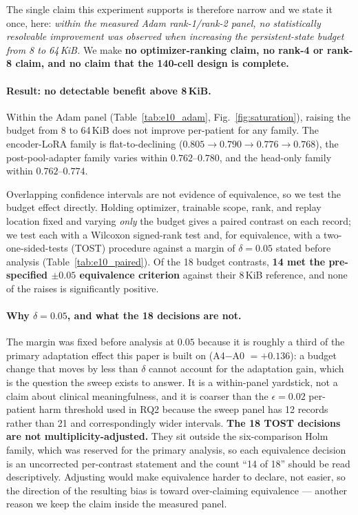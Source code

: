 The single claim this experiment supports is therefore narrow and we state it
once, here: \emph{within the measured Adam rank-1/rank-2 panel, no statistically
resolvable improvement was observed when increasing the persistent-state budget
from 8 to 64\,KiB.} We make \textbf{no optimizer-ranking claim, no rank-4 or
rank-8 claim, and no claim that the 140-cell design is complete.}

\paragraph{Result: no detectable benefit above 8\,KiB.} Within the Adam panel
(Table~\ref{tab:e10_adam}, Fig.~\ref{fig:saturation}), raising the budget from 8
to 64\,KiB does not improve per-patient \macrof{} for any family. The encoder-LoRA
family is flat-to-declining ($0.805 \to 0.790 \to 0.776 \to 0.768$), the
post-pool-adapter family varies within $0.762$--$0.780$, and the head-only family
within $0.762$--$0.774$.

Overlapping confidence intervals are not evidence of equivalence, so we test the
budget effect directly. Holding optimizer, trainable scope, rank, and replay
location fixed and varying \emph{only} the budget gives a paired contrast on each
record; we test each with a Wilcoxon signed-rank test and, for equivalence, with
a two-one-sided-tests (TOST) procedure against a margin of $\delta = 0.05$
\macrof{} stated before analysis (Table~\ref{tab:e10_paired}). Of the 18
budget contrasts, \textbf{14 met the pre-specified $\pm 0.05$ equivalence
criterion} against their 8\,KiB reference, and none of the raises is
significantly positive.

\paragraph{Why $\delta = 0.05$, and what the 18 decisions are not.} The margin
was fixed before analysis at $0.05$ \macrof{} because it is roughly a third of
the primary adaptation effect this paper is built on (A4$-$A0 $= +0.136$): a
budget change that moves \macrof{} by less than $\delta$ cannot account for the
adaptation gain, which is the question the sweep exists to answer. It is a
within-panel yardstick, not a claim about clinical meaningfulness, and it is
coarser than the $\epsilon = 0.02$ per-patient harm threshold used in RQ2
because the sweep panel has 12 records rather than 21 and correspondingly wider
intervals. \textbf{The 18 TOST decisions are not multiplicity-adjusted.} They
sit outside the six-comparison Holm family, which was reserved for the primary
analysis, so each equivalence decision is an uncorrected per-contrast statement
and the count ``14 of 18'' should be read descriptively. Adjusting would make
equivalence harder to declare, not easier, so the direction of the resulting
bias is toward over-claiming equivalence --- another reason we keep the claim
inside the measured panel.

